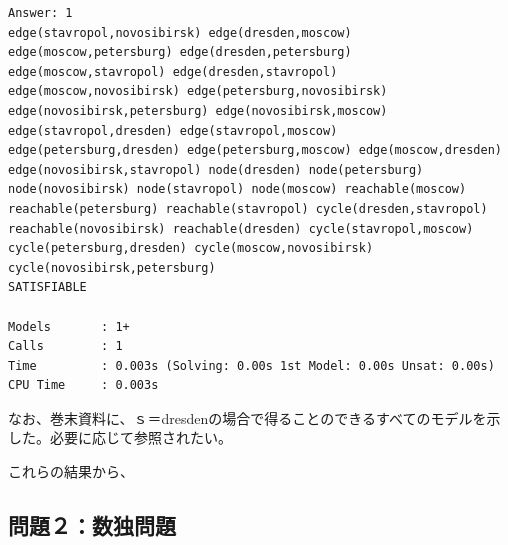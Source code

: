 \documentclass[dvipdfmx]{jsarticle}
\begin{document}
\begin{verbatim}
Answer: 1
edge(stavropol,novosibirsk) edge(dresden,moscow) edge(moscow,petersburg) edge(dresden,petersburg) edge(moscow,stavropol) edge(dresden,stavropol) edge(moscow,novosibirsk) edge(petersburg,novosibirsk) edge(novosibirsk,petersburg) edge(novosibirsk,moscow) edge(stavropol,dresden) edge(stavropol,moscow) edge(petersburg,dresden) edge(petersburg,moscow) edge(moscow,dresden) edge(novosibirsk,stavropol) node(dresden) node(petersburg) node(novosibirsk) node(stavropol) node(moscow) reachable(moscow) reachable(petersburg) reachable(stavropol) cycle(dresden,stavropol) reachable(novosibirsk) reachable(dresden) cycle(stavropol,moscow) cycle(petersburg,dresden) cycle(moscow,novosibirsk) cycle(novosibirsk,petersburg)
SATISFIABLE

Models       : 1+
Calls        : 1
Time         : 0.003s (Solving: 0.00s 1st Model: 0.00s Unsat: 0.00s)
CPU Time     : 0.003s

\end{verbatim}
なお、巻末資料に、ｓ＝dresdenの場合で得ることのできるすべてのモデルを示した。必要に応じて参照されたい。\par
これらの結果から、

\subsection{問題２：数独問題}
\end{document}
